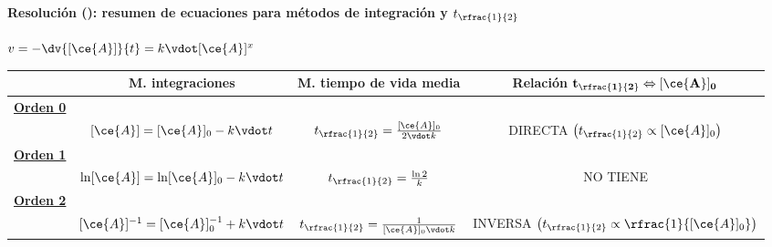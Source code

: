 
\begin{frame}
	\frametitle{\ejerciciocmd}
	\framesubtitle{Resolución (): resumen de ecuaciones para métodos de integración y $t_{\rfrac{1}{2}}$}
	\begin{center}
	\end{center}
	 $v = -\dv{[\ce{A}]}{t} = k\vdot[\ce{A}]^x$
	\begin{center}
		\begin{tabular}{lccc}
						&	\textbf{M. integraciones}	&	\textbf{M. tiempo de vida media}	&	\textbf{Relación $\mathbf{t_{\rfrac{1}{2}}\Leftrightarrow[\ce{A}]_0}$}	\\
			\midrule
			\underline{\textbf{\color{blue}Orden 0}}										\\
						&	$[\ce{A}] = [\ce{A}]_0 - k\vdot t$								&
							$t_{\rfrac{1}{2}} = \frac{[\ce{A}]_0}{2\vdot k}$				&
							DIRECTA	$\left(t_{\rfrac{1}{2}}\propto[\ce{A}]_0\right)$		\\[.3cm]
			\midrule
			\underline{\textbf{\color{blue}Orden 1}}										\\
						&	$\ln[\ce{A}] = \ln[\ce{A}]_0 - k\vdot t$						&
							$t_{\rfrac{1}{2}} = \frac{\ln 2}{k}$							&
							NO TIENE														\\[.3cm]
			\midrule
			\underline{\textbf{\color{blue}Orden 2}}										\\
						&	$[\ce{A}]^{-1} = [\ce{A}]^{-1}_0 + k\vdot t$					&
						$t_{\rfrac{1}{2}} = \frac{1}{[\ce{A}]_0\vdot k}$					&
						INVERSA $\left(t_{\rfrac{1}{2}}\propto\rfrac{1}{[\ce{A}]_0}\right)$
		\end{tabular}
	\end{center}
\end{frame}

